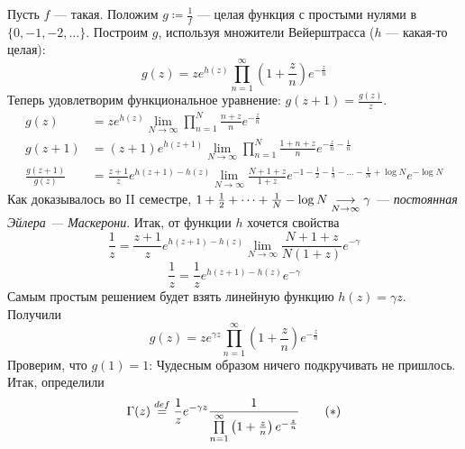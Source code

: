 \documentclass[a4paper]{report}
\begin{document}
    Пусть $f$ --- такая.
    Положим $g \coloneqq \frac{1}{f}$ --- целая функция с простыми нулями в $\{0, -1, -2, \dots\}$.
    Построим $g$, используя множители Вейерштрасса ($h$ --- какая-то целая):
    \[g(z) = z e^{h(z)} \prod\limits_{n = 1}^{\infty}\left(1 + \frac{z}{n}\right)e^{-\frac{z}{n}}\]
    Теперь удовлетворим функциональное уравнение: $g(z + 1) = \frac{g(z)}{z}$.
    \begin{align*}g(z) &= z e^{h(z)}\lim\limits_{N \to \infty}\prod\limits_{n = 1}^{N}\frac{n + z}{n}e^{-\frac{z}{n}}\\
    g(z + 1) &= (z + 1)e^{h(z + 1)}\lim\limits_{N \to \infty}\prod\limits_{n = 1}^{N}\frac{1 + n + z}{n}e^{-\frac{z}{n} - \frac{1}{n}}\\
    \frac{g(z + 1)}{g(z)} &= \frac{z + 1}{z}e^{h(z + 1) - h(z)}\lim\limits_{N \to \infty}\frac{N + 1 + z}{1 + z}e^{-1 - \frac{1}{2} - \frac{1}{3} - \dots - \frac{1}{N} + \log N}e^{-\log N}\end{align*}
    Как доказывалось во II семестре, $1 + \frac{1}{2} + \dots + \frac{1}{N} - \log N \underset{N \to \infty}{\longrightarrow} \gamma$ --- \emph{постоянная Эйлера --- Маскерони}.
    Итак, от функции $h$ хочется свойства
    $$\frac 1z = \frac{z + 1}{z} e^{h(z + 1) - h(z)} \lim\limits_{N \to \infty} \frac{N + 1 + z}{N(1 + z)} e^{-\gamma}$$
    \[\frac{1}{z} = \frac{1}{z}e^{h(z + 1) - h(z)}e^{-\gamma}\]
    Самым простым решением будет взять линейную функцию $h(z) = \gamma z$.
    Получили
    \[g(z) = z e^{\gamma z}\prod\limits_{n = 1}^{\infty}\left(1 + \frac{z}{n}\right)e^{-\frac{z}{n}}\]
    Проверим, что $g(1) = 1$:
    Чудесным образом ничего подкручивать не пришлось.
    Итак, определили
    \[\Gamma(z) \overset{def}{=} \frac{1}{z}e^{-\gamma z} \frac{1}{\prod\limits_{n = 1}^{\infty}\left(1 + \frac{z}{n}\right)e^{-\frac{z}{n}}}\tag{$*$}\label{gamma-def}\]
\end{document}
